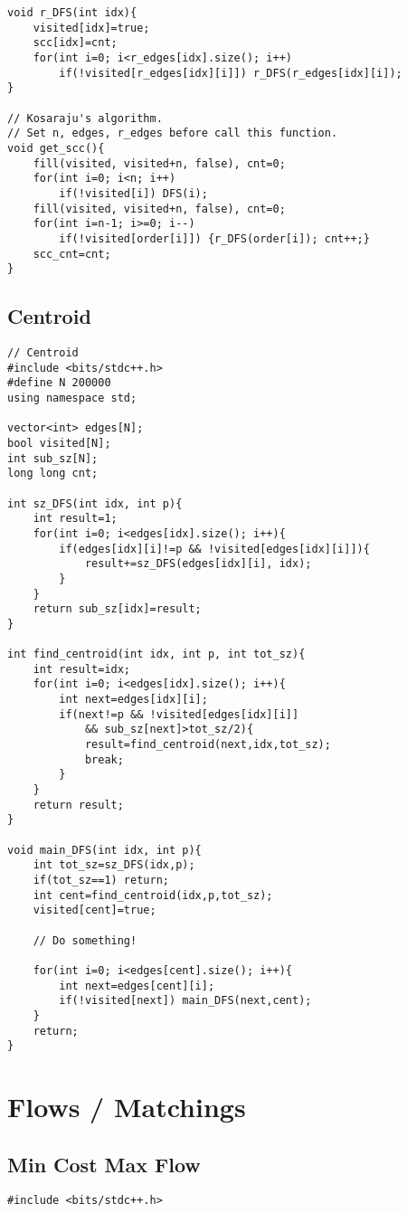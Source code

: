 \documentclass[10pt, landscape]{article}
\begin{document}
\begin{multicols}{2}
\begin{verbatim}
void r_DFS(int idx){
    visited[idx]=true;
    scc[idx]=cnt;
    for(int i=0; i<r_edges[idx].size(); i++) 
        if(!visited[r_edges[idx][i]]) r_DFS(r_edges[idx][i]);
}

// Kosaraju's algorithm. 
// Set n, edges, r_edges before call this function.
void get_scc(){
    fill(visited, visited+n, false), cnt=0;
    for(int i=0; i<n; i++) 
        if(!visited[i]) DFS(i);
    fill(visited, visited+n, false), cnt=0;
    for(int i=n-1; i>=0; i--) 
        if(!visited[order[i]]) {r_DFS(order[i]); cnt++;}
    scc_cnt=cnt;
}
\end{verbatim}


\subsection{Centroid}
\begin{verbatim}
// Centroid
#include <bits/stdc++.h>
#define N 200000
using namespace std;
 
vector<int> edges[N];
bool visited[N];
int sub_sz[N];
long long cnt;

int sz_DFS(int idx, int p){
	int result=1;
	for(int i=0; i<edges[idx].size(); i++){
		if(edges[idx][i]!=p && !visited[edges[idx][i]]){
			result+=sz_DFS(edges[idx][i], idx);
		}
	}
	return sub_sz[idx]=result;
}

int find_centroid(int idx, int p, int tot_sz){
	int result=idx;
	for(int i=0; i<edges[idx].size(); i++){
		int next=edges[idx][i];
		if(next!=p && !visited[edges[idx][i]] 
            && sub_sz[next]>tot_sz/2){
			result=find_centroid(next,idx,tot_sz);
			break;
		}
	}
	return result;
}

void main_DFS(int idx, int p){
	int tot_sz=sz_DFS(idx,p);
	if(tot_sz==1) return;
	int cent=find_centroid(idx,p,tot_sz);
	visited[cent]=true;
	
	// Do something!
	
	for(int i=0; i<edges[cent].size(); i++){
		int next=edges[cent][i];
		if(!visited[next]) main_DFS(next,cent);
	}
	return;
}
\end{verbatim}

\section{Flows / Matchings}
\subsection{Min Cost Max Flow}
\begin{verbatim}
#include <bits/stdc++.h>


\end{verbatim}
\end{multicols}
\end{document}
